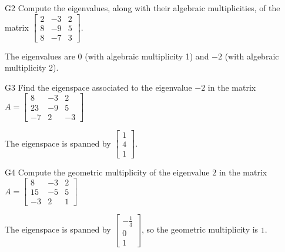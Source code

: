 \documentclass{sbgLAexam}
\begin{document}
\begin{extract}\newpage\end{extract}
\begin{problem}{G2}
Compute the eigenvalues, along with their algebraic multiplicities, of the matrix $ \begin{bmatrix}2 & -3 & 2 \\ 8 & -9 & 5 \\ 8 & -7 & 3 \end{bmatrix}$.
\end{problem}
\begin{solution}
The eigenvalues are $0$ (with algebraic multiplicity 1)
and $-2$ (with algebraic multiplicity 2).
\end{solution}
\begin{problem}{G3}
Find the eigenspace associated to the eigenvalue $-2$ in the matrix $A=\begin{bmatrix}8 & -3 & 2 \\ 23 & -9 & 5 \\ -7 & 2 & -3\end{bmatrix}$
\end{problem}
\begin{solution}
The eigenspace is spanned by $\begin{bmatrix} 1 \\ 4 \\ 1 \end{bmatrix}$.
\end{solution}

\begin{extract}\newpage\end{extract}
\begin{problem}{G4}
Compute the geometric multiplicity of the eigenvalue $2$ in the matrix $A=\begin{bmatrix}8 & -3 & 2 \\ 15 & -5 & 5 \\ -3 & 2 & 1\end{bmatrix}$
\end{problem}
\begin{solution}
The eigenspace is spanned by $\begin{bmatrix} -\frac{1}{3} \\ 0 \\ 1 \end{bmatrix}$, so the geometric multiplicity is $1$.
\end{solution}
\end{document}
